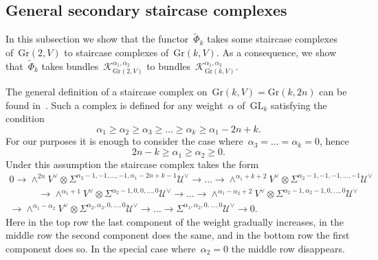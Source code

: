 \documentclass[a4paper]{article}
\newcommand{\Gr}{\mathrm{Gr}}
\newcommand{\GL}{\mathrm{GL}}
\newcommand{\cK}{\mathcal{K}}
\newcommand{\cU}{\mathcal{U}}
\theoremstyle{remark}
\theoremstyle{definition}
\begin{document}
\subsection{General secondary staircase complexes}


In this subsection we show that the functor~\(\tilde\Phi_k\) 
takes some staircase complexes of~\(\Gr(2,V)\) to staircase complexes of~\(\Gr(k,V)\).
As a consequence, we show that~\(\tilde\Phi_k\) takes bundles~\(\cK_{\Gr(2,V)}^{\alpha_1,\alpha_2}\) to bundles~\(\cK_{\Gr(k,V)}^{\alpha_1,\alpha_2}\).

The general definition of a staircase complex on~\(\Gr(k,V) = \Gr(k,2n)\) can be found in~\cite{Fonarev_2013}.
Such a complex is defined for any weight~\(\alpha\) of~\(\GL_k\) satisfying the condition
\begin{equation*}
\alpha_1 \ge \alpha_2 \ge \alpha_3 \ge \dots \ge \alpha_k \ge \alpha_1 - 2n + k .
\end{equation*}
For our purposes it is enough to consider the case where~\(\alpha_3 = \dots = \alpha_k = 0\), hence
\begin{equation*}
2n - k \ge \alpha_1 \ge \alpha_2 \ge 0.
\end{equation*}
Under this assumption the staircase complex takes the form
\begin{multline}
\label{eq:staircase-3-lines}
0 \to 
\wedge^{2n}V^\vee \otimes \Sigma^{\alpha_2-1,-1,\dots,-1,\alpha_1-2n+k-1}\cU^\vee \to 
\dots \to 
\wedge^{\alpha_1+k+2} V^\vee \otimes \Sigma^{\alpha_2-1,-1,-1,\dots,-1}\cU^\vee \\ \qquad\quad  \to 
\wedge^{\alpha_1+1} V^\vee \otimes \Sigma^{\alpha_2-1,0,0,\dots,0}\cU^\vee \to 
\dots \to 
\wedge^{\alpha_1-\alpha_2+2} V^\vee \otimes \Sigma^{\alpha_2-1,\alpha_2-1,0,\dots,0}\cU^\vee \\ \to 
\wedge^{\alpha_1-\alpha_2} V^\vee \otimes \Sigma^{\alpha_2,\alpha_2,0,\dots,0}\cU^\vee \to 
\dots \to
\Sigma^{\alpha_1,\alpha_2,0,\dots,0}\cU^\vee \to 
0.
\end{multline}
Here in the top row the last component  of the weight gradually increases,
in the middle row the second component does the same,
and in the bottom row the first component does so.
In the special case where~\(\alpha_2 = 0\) the middle row disappears.
\end{document}
